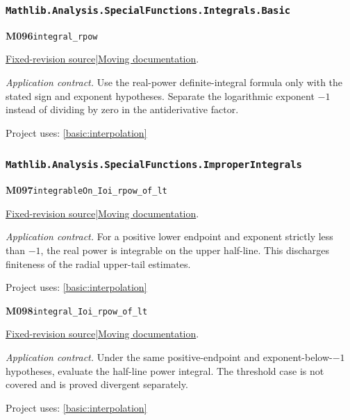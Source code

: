 \documentclass[11pt,a4paper]{article}
\theoremstyle{definition}
\theoremstyle{remark}
\begin{document}
\subsubsection*{\nolinkurl{Mathlib.Analysis.SpecialFunctions.Integrals.Basic}}
\noindent\textbf{M096}\label{base:M096}\quad\nolinkurl{integral_rpow}

\href{https://github.com/leanprover-community/mathlib4/blob/9bac2d0692944a775113f7c130fd5e5b4608a854/Mathlib/Analysis/SpecialFunctions/Integrals/Basic.lean}{Fixed-revision source}\quad|\quad\href{https://leanprover-community.github.io/mathlib4_docs/Mathlib/Analysis/SpecialFunctions/Integrals/Basic.html#integral_rpow}{Moving documentation}.\par
\noindent\textit{Application contract.} Use the real-power definite-integral formula only with the stated sign and exponent hypotheses. Separate the logarithmic exponent $-1$ instead of dividing by zero in the antiderivative factor.\par
{\small Project uses: \ref{basic:interpolation}}\par\medskip

\subsubsection*{\nolinkurl{Mathlib.Analysis.SpecialFunctions.ImproperIntegrals}}
\noindent\textbf{M097}\label{base:M097}\quad\nolinkurl{integrableOn_Ioi_rpow_of_lt}

\href{https://github.com/leanprover-community/mathlib4/blob/9bac2d0692944a775113f7c130fd5e5b4608a854/Mathlib/Analysis/SpecialFunctions/ImproperIntegrals.lean}{Fixed-revision source}\quad|\quad\href{https://leanprover-community.github.io/mathlib4_docs/Mathlib/Analysis/SpecialFunctions/ImproperIntegrals.html#integrableOn_Ioi_rpow_of_lt}{Moving documentation}.\par
\noindent\textit{Application contract.} For a positive lower endpoint and exponent strictly less than $-1$, the real power is integrable on the upper half-line. This discharges finiteness of the radial upper-tail estimates.\par
{\small Project uses: \ref{basic:interpolation}}\par\medskip

\noindent\textbf{M098}\label{base:M098}\quad\nolinkurl{integral_Ioi_rpow_of_lt}

\href{https://github.com/leanprover-community/mathlib4/blob/9bac2d0692944a775113f7c130fd5e5b4608a854/Mathlib/Analysis/SpecialFunctions/ImproperIntegrals.lean}{Fixed-revision source}\quad|\quad\href{https://leanprover-community.github.io/mathlib4_docs/Mathlib/Analysis/SpecialFunctions/ImproperIntegrals.html#integral_Ioi_rpow_of_lt}{Moving documentation}.\par
\noindent\textit{Application contract.} Under the same positive-endpoint and exponent-below-$-1$ hypotheses, evaluate the half-line power integral. The threshold case is not covered and is proved divergent separately.\par
{\small Project uses: \ref{basic:interpolation}}\par\medskip
\end{document}
